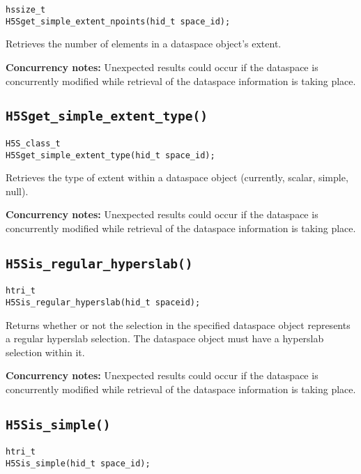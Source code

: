 \documentclass[../HDF5_RFC.tex]{subfiles}
\begin{document}
\begin{verbatim}
hssize_t
H5Sget_simple_extent_npoints(hid_t space_id);
\end{verbatim}

Retrieves the number of elements in a dataspace object's extent.

\textbf{Concurrency notes:} Unexpected results could occur if the dataspace is concurrently modified
while retrieval of the dataspace information is taking place.

\subsection{\texttt{H5Sget\_simple\_extent\_type()}}
\label{apdx:h5s_func_h5sget_simple_extent_type}

\begin{verbatim}
H5S_class_t
H5Sget_simple_extent_type(hid_t space_id);
\end{verbatim}

Retrieves the type of extent within a dataspace object (currently, scalar, simple, null).

\textbf{Concurrency notes:} Unexpected results could occur if the dataspace is concurrently modified
while retrieval of the dataspace information is taking place.

\subsection{\texttt{H5Sis\_regular\_hyperslab()}}
\label{apdx:h5s_func_h5sis_regular_hyperslab}

\begin{verbatim}
htri_t
H5Sis_regular_hyperslab(hid_t spaceid);
\end{verbatim}

Returns whether or not the selection in the specified dataspace object represents a regular
hyperslab selection. The dataspace object must have a hyperslab selection within it.

\textbf{Concurrency notes:} Unexpected results could occur if the dataspace is concurrently modified
while retrieval of the dataspace information is taking place.

\subsection{\texttt{H5Sis\_simple()}}
\label{apdx:h5s_func_h5sis_simple}

\begin{verbatim}
htri_t
H5Sis_simple(hid_t space_id);
\end{verbatim}
\end{document}
